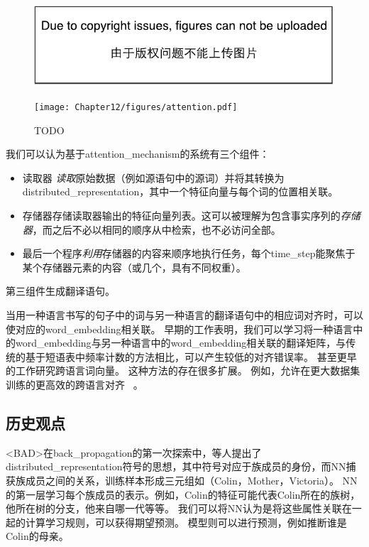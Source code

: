 \begin{figure}[htp]
\ifOpenSource
\centerline{\includegraphics{figure.pdf}}
\else
\centerline{\texttt{[image: Chapter12/figures/attention.pdf]}}
\fi
\caption{TODO}
\label{fig:chap12_attention}
\end{figure}

我们可以认为基于\gls{attention_mechanism}的系统有三个组件：
\begin{itemize}
 \item   读取器 \emph{读取}原始数据（例如源语句中的源词）并将其转换为\gls{distributed_representation}，其中一个特征向量与每个词的位置相关联。
 \item 存储器存储读取器输出的特征向量列表。这可以被理解为包含事实序列的\emph{存储器}，而之后不必以相同的顺序从中检索，也不必访问全部。
 \item 最后一个程序\emph{利用}存储器的内容来顺序地执行任务，每个\gls{time_step}能聚焦于某个存储器元素的内容（或几个，具有不同权重）。
\end{itemize}
第三组件生成翻译语句。


当用一种语言书写的句子中的词与另一种语言的翻译语句中的相应词对齐时，可以使对应的\gls{word_embedding}相关联。
早期的工作表明，我们可以学习将一种语言中的\gls{word_embedding}与另一种语言中的\gls{word_embedding}相关联的翻译矩阵\citep{Kocisky-et-al-ACL2014}，与传统的基于短语表中频率计数的方法相比，可以产生较低的对齐错误率。
甚至更早的工作\citep{Klementiev-et-al-COLING2012}研究跨语言词向量。 
这种方法的存在很多扩展。
例如，允许在更大数据集训练的更高效的跨语言对齐~\citep{Gouws-et-al-arxiv2014} 。

\subsection{历史观点}
\label{sec:historical_perspective_chap12}

<BAD>在\gls{back_propagation}的第一次探索中，\citet{Rumelhart86b-small}等人提出了\gls{distributed_representation}符号的思想，其中符号对应于族成员的身份，而\gls{NN}捕获族成员之间的关系，训练样本形成三元组如（Colin，Mother，Victoria）。
\gls{NN}的第一层学习每个族成员的表示。例如，Colin的特征可能代表Colin所在的族树，他所在树的分支，他来自哪一代等等。
我们可以将\gls{NN}认为是将这些属性关联在一起的计算学习规则，可以获得期望预测。
模型则可以进行预测，例如推断谁是Colin的母亲。


